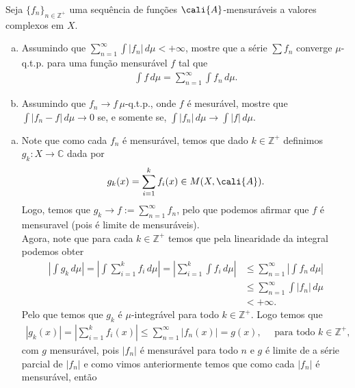 \begin{homeworkProblem}[4]
  Seja $\{f_n\}_{n\in\mathbb{Z}^{+}}$ uma sequência de funções $\cali{A}$-mensuráveis a valores complexos em $X$.
  \begin{enumerate}[a)]
    \item Assumindo que $\sum_{n=1}^{\infty}\int|f_n|\,d\mu<+\infty$, mostre que a série $\sum f_n$ converge $\mu$-q.t.p. para uma função mensurável $f$ tal que
      \begin{align*}
        \int f\,d\mu=\sum_{n=1}^{\infty}\int f_n\,d\mu.
      \end{align*}
    \item Assumindo que $f_n\to f\,\mu$-q.t.p., onde $f$ é mesurável, mostre que $\int |f_n-f|\,d\mu\to 0$ se, e somente se, $\int |f_n|\,d\mu\to \int |f|\,d\mu$. 
  \end{enumerate}
  \begin{solution}
    \begin{enumerate}[a)]
    \item Note que como cada $f_n$ é mensurável, temos que dado $k\in\mathbb{Z}^{+}$ definimos $g_k:X\to\mathbb{C}$ dada por
      \begin{align*}
        g_k(x)=\sum_{i=1}^{k}f_i(x)\in M(X,\cali{A}).
      \end{align*}
      Logo, temos que $g_k\to f:=\sum_{n=1}^{\infty}f_n$, pelo que podemos afirmar que $f$ é mensuravel (pois é limite de mensuráveis).\\
      Agora, note que para cada $k\in\mathbb{Z}^{+}$ temos que pela linearidade da integral podemos obter
      \begin{align*}
        \left|\int g_k\,d\mu\right| = \left|\int\sum_{i=1}^{k}f_i\,d\mu\right|
        =\left|\sum_{i=1}^{k}\int f_i\,d\mu\right| 
        &\leq\sum_{n=1}^{\infty}\left| \int f_n\,d\mu \right|\\
        &\leq\sum_{n=1}^{\infty}\int|f_n|\,d\mu\\
        &<+\infty.
      \end{align*}
      Pelo que temos que $g_k$ é $\mu$-integrável para todo $k\in\mathbb{Z}^{+}$.
      Logo temos que
      \begin{align*}
        |g_k(x)|=\left| \sum_{i=1}^{k}f_i(x) \right|\leq\sum_{n=1}^{\infty}\left|f_n(x)\right|=g(x),\quad\text{ para todo }k\in\mathbb{Z}^{+},
      \end{align*}
      com $g$ mensurável, pois $|f_n|$ é mensurável para todo $n$ e $g$ é limite de a série  parcial de $|f_n|$ e como vimos anteriormente temos que como cada  $|f_n|$ é mensurável, então 

\end{enumerate}
\end{solution}
\end{homeworkProblem}
